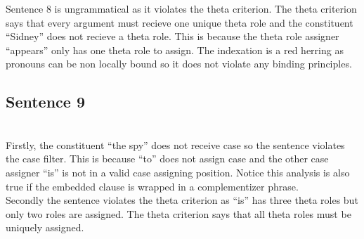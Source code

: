 \documentclass[20pt]{article}
\newcommand{\feature}[1]{\ensuremath{\left[ \text{#1} \right]}}
\newcommand{\treeScale}[0]{0.7}
\newcommand{\rolesOpacity}[0]{0.7}
\begin{document}
Sentence 8 is ungrammatical as it violates the theta criterion. The theta
criterion says that every argument must recieve one unique theta role and the
constituent ``Sidney'' does not recieve a theta role. This is because the theta
role assigner ``appears'' only has one theta role to assign. The indexation is a
red herring as pronouns can be non locally bound so it does not violate any
binding principles. 
\subsection*{Sentence 9}
 \\

Firstly, the constituent ``the spy'' does not receive case so the sentence
violates the case filter. This is because ``to'' does not assign case and
the other case assigner ``is'' is not in a valid case assigning position.
Notice this analysis is also true if the embedded clause is wrapped
in a complementizer phrase. \\

Secondly the sentence violates the theta criterion as ``is'' has three theta
roles but only two roles are assigned. The theta criterion says that all theta
roles must be uniquely assigned.
\end{document}
